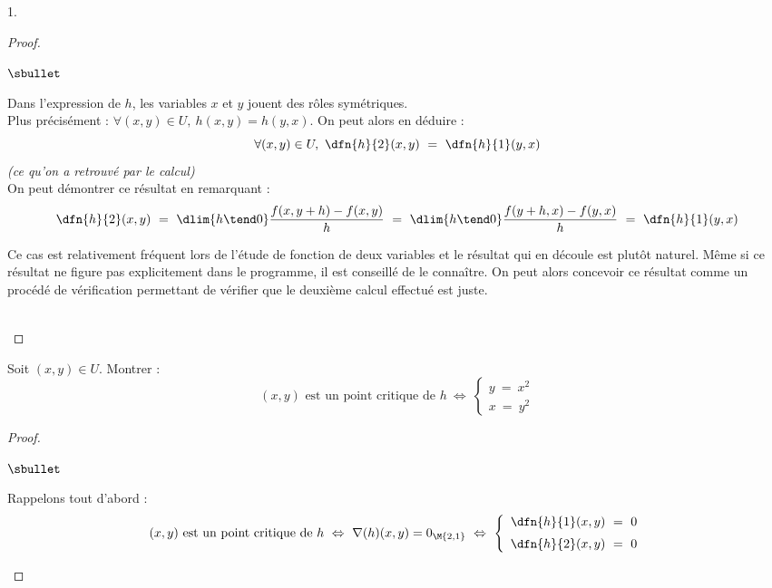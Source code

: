 \documentclass[11pt]{article}%
\begin{document}
\begin{noliste}{1.}
\begin{proof}
\begin{remarkL}{.98}
\begin{noliste}{$\sbullet$}
      \item Dans l'expression de $h$, les variables $x$ et $y$ jouent
        des rôles symétriques.\\
        Plus précisément : $\forall (x, y) \in U, \ h(x, y) = h(y,
        x)$. On peut alors en déduire :
        \[
        \forall (x, y) \in U, \ \dfn{h}{2}(x, y) \ = \ \dfn{h}{1}(y, x)
        \]
        {\it (ce qu'on a retrouvé par le calcul)}\\[.1cm]
        On peut démontrer ce résultat en remarquant :
        \[
        \dfn{h}{2}(x, y) \ = \ \dlim{h \tend 0} \dfrac{f(x, y + h) -
          f(x, y)}{h} \ = \ \dlim{h \tend 0} \dfrac{f(y + h, x) - f(y,
          x)}{h} \ = \ \dfn{h}{1}(y, x)
        \]

      \item Ce cas est relativement fréquent lors de l'étude de
        fonction de deux variables et le résultat qui en découle est
        plutôt naturel. Même si ce résultat ne figure pas
        explicitement dans le programme, il est conseillé de le
        connaître. On peut alors concevoir ce résultat comme un
        procédé de vérification permettant de vérifier que le deuxième
        calcul effectué est juste.
      \end{noliste}
    \end{remarkL}~\\[-1.4cm]
  \end{proof}
  

  \newpage


\item Soit $(x,y) \in U$. Montrer :
  \[
  \text{$(x,y)$ est un point critique de $h$} \ \Leftrightarrow \
  \left\{
    \begin{array}{l}
      y \ = \ x^2 \\[.1cm]
      x \ = \ y^2
    \end{array}
  \right.
  \]
  
  \begin{proof}~%
    \begin{noliste}{$\sbullet$}
    \item Rappelons tout d'abord :
      \[
      \text{$(x, y)$ est un point critique de $h$} \ \Leftrightarrow \
      \nabla(h)(x, y) = 0_{\M{2,1}} \ \Leftrightarrow \ \left\{
        \begin{array}{l}
          \dfn{h}{1}(x, y) \ = \ 0
          \\[.2cm]
          \dfn{h}{2}(x, y) \ = \ 0
        \end{array}
      \right.
      \]


\end{noliste}
\end{proof}
\end{noliste}
\end{document}
